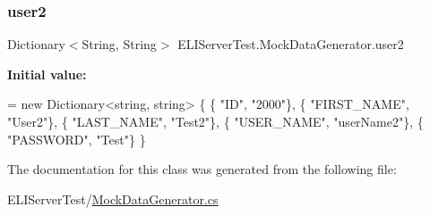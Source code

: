 \subsubsection{\texorpdfstring{user2}{user2}}
{\footnotesize\ttfamily Dictionary$<$String, String$>$ E\+L\+I\+Server\+Test.\+Mock\+Data\+Generator.\+user2}

{\bfseries Initial value\+:}
\begin{DoxyCode}
= \textcolor{keyword}{new} Dictionary<string, string> \{
            \{ \textcolor{stringliteral}{"ID"}, \textcolor{stringliteral}{"2000"}\},
            \{ \textcolor{stringliteral}{"FIRST\_NAME"}, \textcolor{stringliteral}{"User2"}\},
            \{ \textcolor{stringliteral}{"LAST\_NAME"}, \textcolor{stringliteral}{"Test2"}\},
            \{ \textcolor{stringliteral}{"USER\_NAME"}, \textcolor{stringliteral}{"userName2"}\},
            \{ \textcolor{stringliteral}{"PASSWORD"}, \textcolor{stringliteral}{"Test"}\}
        \}
\end{DoxyCode}


The documentation for this class was generated from the following file\+:\begin{DoxyCompactItemize}
\item 
E\+L\+I\+Server\+Test/\hyperlink{_mock_data_generator_8cs}{Mock\+Data\+Generator.\+cs}\end{DoxyCompactItemize}
